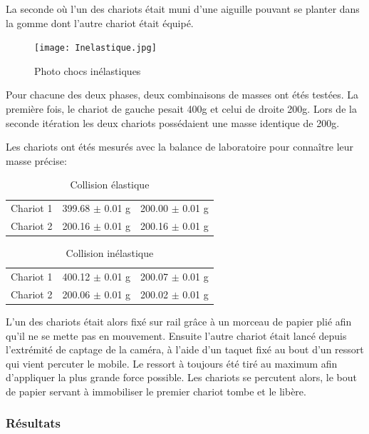\newpage

La seconde où l'un des chariots était muni d'une aiguille pouvant se planter dans la gomme dont l'autre chariot était équipé.

\begin{figure}[h]
    \caption[Photo]{Photo chocs inélastiques}
    \centering
    \texttt{[image: Inelastique.jpg]}
\end{figure}

Pour chacune des deux phases, deux combinaisons de masses ont étés testées. La première fois, le chariot de gauche pesait 400g et celui de droite 200g. Lors de la seconde itération les deux chariots possédaient une masse identique de 200g.

Les chariots ont étés mesurés avec la balance de laboratoire pour connaître leur masse précise:
\begin{table}[h]
    \centering
    \caption{Collision élastique}
    \begin{tabular}{|l|l|l|}
	\hline
	Chariot 1 & 399.68 $\pm$ 0.01 g & 200.00 $\pm$ 0.01 g \\
	Chariot 2 & 200.16 $\pm$ 0.01 g & 200.16 $\pm$ 0.01 g \\
	\hline
    \end{tabular}
\end{table}

\begin{table}[h]
    \centering
    \caption{Collision inélastique}
    \begin{tabular}{|l|l|l|}
	\hline
	Chariot 1 & 400.12 $\pm$ 0.01 g & 200.07 $\pm$ 0.01 g \\
	Chariot 2 & 200.06 $\pm$ 0.01 g & 200.02 $\pm$ 0.01 g \\
	\hline
    \end{tabular}
\end{table}

L'un des chariots était alors fixé sur rail grâce à un morceau de papier plié afin qu'il ne se mette pas en mouvement. Ensuite l'autre chariot était lancé depuis l'extrémité de captage de la caméra, à l'aide d'un taquet fixé au bout d'un ressort qui vient percuter le mobile. Le ressort à toujours été tiré au maximum afin d'appliquer la plus grande force possible. Les chariots se percutent alors, le bout de papier servant à immobiliser le premier chariot tombe et le libère.

\newpage
\subsubsection{Résultats}

